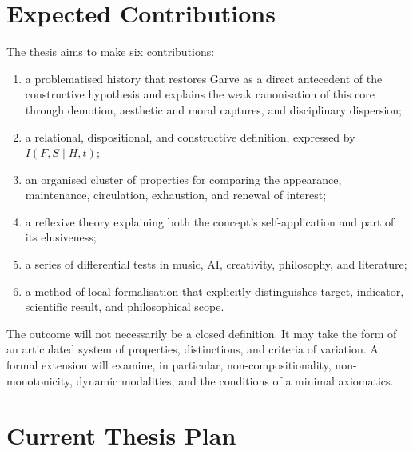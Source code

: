 \documentclass[11pt,a4paper]{article}
\begin{document}
\section{Expected Contributions}

The thesis aims to make six contributions:

\begin{enumerate}
  \item a problematised history that restores Garve as a direct antecedent of
        the constructive hypothesis and explains the weak canonisation of this
        core through demotion, aesthetic and moral captures, and disciplinary
        dispersion;
  \item a relational, dispositional, and constructive definition, expressed by
        \(I(F,S\mid H,t)\);
  \item an organised cluster of properties for comparing the appearance,
        maintenance, circulation, exhaustion, and renewal of interest;
  \item a reflexive theory explaining both the concept's self-application and
        part of its elusiveness;
  \item a series of differential tests in music, AI, creativity, philosophy,
        and literature;
  \item a method of local formalisation that explicitly distinguishes target,
        indicator, scientific result, and philosophical scope.
\end{enumerate}

The outcome will not necessarily be a closed definition. It may take the form
of an articulated system of properties, distinctions, and criteria of
variation. A formal extension will examine, in particular,
non-compositionality, non-monotonicity, dynamic modalities, and the conditions
of a minimal axiomatics.

\section{Current Thesis Plan}
\end{document}
